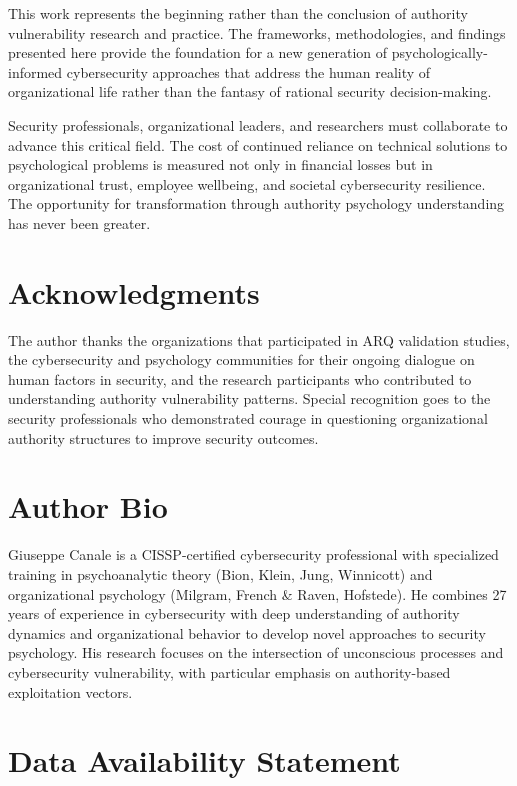 \documentclass[11pt,a4paper]{article}
\begin{document}
This work represents the beginning rather than the conclusion of authority vulnerability research and practice. The frameworks, methodologies, and findings presented here provide the foundation for a new generation of psychologically-informed cybersecurity approaches that address the human reality of organizational life rather than the fantasy of rational security decision-making.

Security professionals, organizational leaders, and researchers must collaborate to advance this critical field. The cost of continued reliance on technical solutions to psychological problems is measured not only in financial losses but in organizational trust, employee wellbeing, and societal cybersecurity resilience. The opportunity for transformation through authority psychology understanding has never been greater.

\section*{Acknowledgments}

The author thanks the organizations that participated in ARQ validation studies, the cybersecurity and psychology communities for their ongoing dialogue on human factors in security, and the research participants who contributed to understanding authority vulnerability patterns. Special recognition goes to the security professionals who demonstrated courage in questioning organizational authority structures to improve security outcomes.

\section*{Author Bio}

Giuseppe Canale is a CISSP-certified cybersecurity professional with specialized training in psychoanalytic theory (Bion, Klein, Jung, Winnicott) and organizational psychology (Milgram, French \& Raven, Hofstede). He combines 27 years of experience in cybersecurity with deep understanding of authority dynamics and organizational behavior to develop novel approaches to security psychology. His research focuses on the intersection of unconscious processes and cybersecurity vulnerability, with particular emphasis on authority-based exploitation vectors.

\section*{Data Availability Statement}
\end{document}
